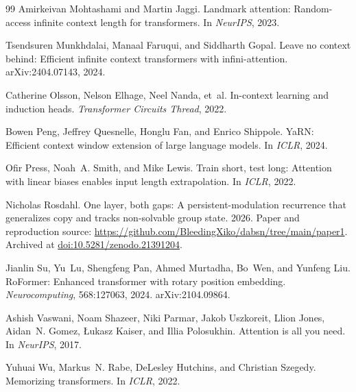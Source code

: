 \documentclass[11pt]{article}
\begin{document}
\begin{thebibliography}{99}
Amirkeivan Mohtashami and Martin Jaggi. Landmark attention: Random-access infinite
context length for transformers. In \emph{NeurIPS}, 2023.

Tsendsuren Munkhdalai, Manaal Faruqui, and Siddharth Gopal. Leave no context
behind: Efficient infinite context transformers with infini-attention.
arXiv:2404.07143, 2024.

Catherine Olsson, Nelson Elhage, Neel Nanda, et~al. In-context learning and
induction heads. \emph{Transformer Circuits Thread}, 2022.

Bowen Peng, Jeffrey Quesnelle, Honglu Fan, and Enrico Shippole. YaRN: Efficient
context window extension of large language models. In \emph{ICLR}, 2024.

Ofir Press, Noah~A. Smith, and Mike Lewis. Train short, test long: Attention with
linear biases enables input length extrapolation. In \emph{ICLR}, 2022.

Nicholas Rosdahl. One layer, both gaps: A persistent-modulation recurrence that
generalizes copy and tracks non-solvable group state. 2026.
Paper and reproduction source:
\url{https://github.com/BleedingXiko/dabsn/tree/main/paper1}.
Archived at \href{https://doi.org/10.5281/zenodo.21391204}{doi:10.5281/zenodo.21391204}.

Jianlin Su, Yu~Lu, Shengfeng Pan, Ahmed Murtadha, Bo~Wen, and Yunfeng Liu.
RoFormer: Enhanced transformer with rotary position embedding.
\emph{Neurocomputing}, 568:127063, 2024. arXiv:2104.09864.

Ashish Vaswani, Noam Shazeer, Niki Parmar, Jakob Uszkoreit, Llion Jones, Aidan~N.
Gomez, {\L}ukasz Kaiser, and Illia Polosukhin. Attention is all you need. In
\emph{NeurIPS}, 2017.

Yuhuai Wu, Markus~N. Rabe, DeLesley Hutchins, and Christian Szegedy. Memorizing
transformers. In \emph{ICLR}, 2022.

\end{thebibliography}
\end{document}
